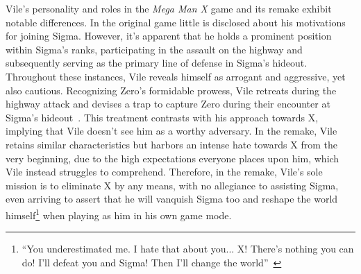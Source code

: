 Vile's personality and roles in the \textit{Mega Man X} game and its remake exhibit notable differences. In the original game little is disclosed about his motivations for joining Sigma. However, it's apparent that he holds a prominent position within Sigma's ranks, participating in the assault on the highway and subsequently serving as the primary line of defense in Sigma's hideout. Throughout these instances, Vile reveals himself as arrogant and aggressive, yet also cautious. Recognizing Zero's formidable prowess, Vile retreats during the highway attack and devises a trap to capture Zero during their encounter at Sigma's hideout~\cite{wiki:Vile}. This treatment contrasts with his approach towards X, implying that Vile doesn't see him as a worthy adversary. In the remake, Vile retains similar characteristics but harbors an intense hate towards X from the very beginning, due to the high expectations everyone places upon him, which Vile instead struggles to comprehend. Therefore, in the remake, Vile's sole mission is to eliminate X by any means, with no allegiance to assisting Sigma, even arriving to assert that he will vanquish Sigma too and reshape the world himself\footnote{\enquote{You underestimated me. I hate that about you... X! There's nothing you can do! I'll defeat you and Sigma! Then I'll change the world}~\cite{wiki:MMX_script}} when playing as him in his own game mode.

